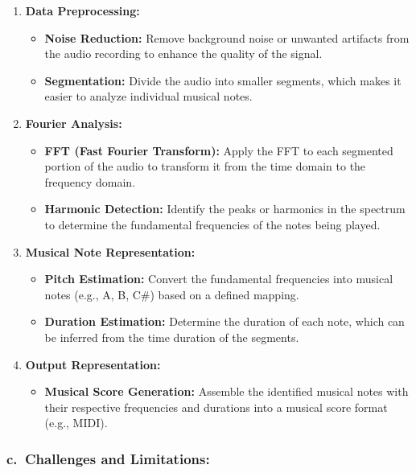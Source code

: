 \documentclass[11pt]{article}
\providecommand{\tightlist}{%
      \setlength{\itemsep}{0pt}\setlength{\parskip}{0pt}}
\begin{document}
\begin{enumerate}
\def\labelenumi{\arabic{enumi}.}
\tightlist
\item
  \textbf{Data Preprocessing:}

  \begin{itemize}
  \tightlist
  \item
    \textbf{Noise Reduction:} Remove background noise or unwanted
    artifacts from the audio recording to enhance the quality of the
    signal.
  \item
    \textbf{Segmentation:} Divide the audio into smaller segments, which
    makes it easier to analyze individual musical notes.
  \end{itemize}
\item
  \textbf{Fourier Analysis:}

  \begin{itemize}
  \tightlist
  \item
    \textbf{FFT (Fast Fourier Transform):} Apply the FFT to each
    segmented portion of the audio to transform it from the time domain
    to the frequency domain.
  \item
    \textbf{Harmonic Detection:} Identify the peaks or harmonics in the
    spectrum to determine the fundamental frequencies of the notes being
    played.
  \end{itemize}
\item
  \textbf{Musical Note Representation:}

  \begin{itemize}
  \tightlist
  \item
    \textbf{Pitch Estimation:} Convert the fundamental frequencies into
    musical notes (e.g., A, B, C\#) based on a defined mapping.
  \item
    \textbf{Duration Estimation:} Determine the duration of each note,
    which can be inferred from the time duration of the segments.
  \end{itemize}
\item
  \textbf{Output Representation:}

  \begin{itemize}
  \tightlist
  \item
    \textbf{Musical Score Generation:} Assemble the identified musical
    notes with their respective frequencies and durations into a musical
    score format (e.g., MIDI).
  \end{itemize}
\end{enumerate}

\hypertarget{c.-challenges-and-limitations}{%
\subsubsection{c.~Challenges and
Limitations:}\label{c.-challenges-and-limitations}}
\end{document}
